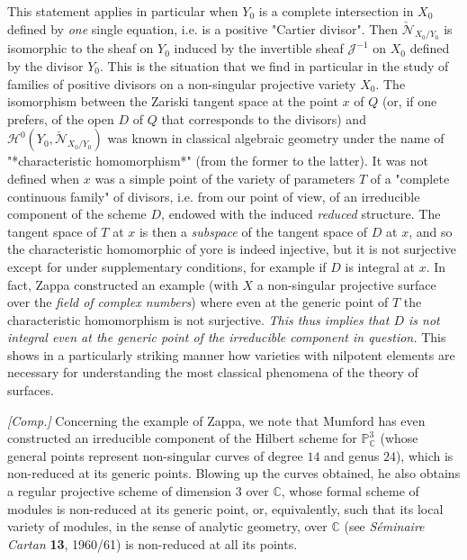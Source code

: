 \begin{remark}\label{fga3.iv-5-remark-5.5}
  This statement applies in particular when $Y_0$ is a complete intersection in $X_0$ defined by \emph{one} single equation, i.e. is a positive "Cartier divisor".
  Then $\check{\mathcal{N}}_{X_0/Y_0}$ is isomorphic to the sheaf on $Y_0$ induced by the invertible sheaf $\mathcal{J}^{-1}$ on $X_0$ defined by the divisor $Y_0$.
  This is the situation that we find in particular in the study of families of positive divisors on a non-singular projective variety $X_0$.
  The isomorphism between the Zariski tangent space at the point $x$ of $Q$ (or, if one prefers, of the open $D$ of $Q$ that corresponds to the divisors) and $\mathcal{H}^0(Y_0,\check{\mathcal{N}}_{X_0/Y_0})$ was known in classical algebraic geometry under the name of "*characteristic homomorphism*" (from the former to the latter).
  It was not defined when $x$ was a simple point of the variety of parameters $T$ of a "complete continuous family" of divisors, i.e. from our point of view, of an irreducible component of the scheme $D$, endowed with the induced \emph{reduced} structure.
  The tangent space of $T$ at $x$ is then a \emph{subspace} of the tangent space of $D$ at $x$, and so the characteristic homomorphic of yore is indeed injective, but it is not surjective except for under supplementary conditions, for example if $D$ is integral at $x$.
  In fact, Zappa \cite{Zap1945} constructed an example (with $X$ a non-singular projective surface over the \emph{field of complex numbers}) where even at the generic point of $T$ the characteristic homomorphism is not surjective.
  \emph{This thus implies that $D$ is not integral even at the generic point of the irreducible component in question.}
  This shows in a particularly striking manner how varieties with nilpotent elements are necessary for understanding the most classical phenomena of the theory of surfaces.

  \emph{[Comp.]}
  Concerning the example of Zappa, we note that Mumford has even constructed an irreducible component of the Hilbert scheme for $\mathbb{P}_\mathbb{C}^3$ (whose general points represent non-singular curves of degree $14$ and genus $24$), which is non-reduced at its generic points.
  Blowing up the curves obtained, he also obtains a regular projective scheme of dimension $3$ over $\mathbb{C}$, whose formal scheme of modules is non-reduced at its generic point, or, equivalently, such that its local variety of modules, in the sense of analytic geometry, over $\mathbb{C}$ (see \emph{Séminaire Cartan} \textbf{13}, 1960/61) is non-reduced at all its points.
\end{remark}

